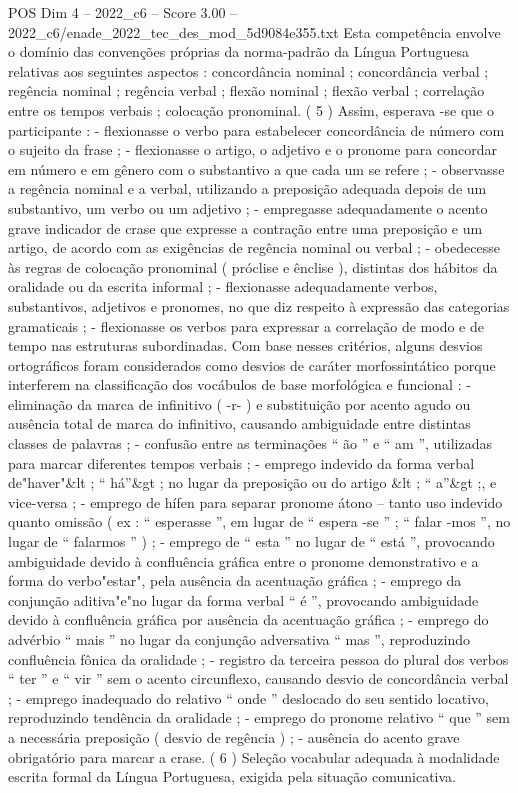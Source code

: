 \begin{textsample}{POS Dim 4 – 2022\_c6 – Score 3.00 – 2022\_c6/enade\_2022\_tec\_des\_mod\_5d9084e355.txt}
Esta competência envolve o domínio das convenções próprias da norma-padrão da Língua Portuguesa relativas aos seguintes aspectos : concordância nominal ; concordância verbal ; regência nominal ; regência verbal ; flexão nominal ; flexão verbal ; correlação entre os tempos verbais ; colocação pronominal. ( 5 ) Assim, esperava -se que o participante : - flexionasse o verbo para estabelecer concordância de número com o sujeito da frase ; - flexionasse o artigo, o adjetivo e o pronome para concordar em número e em gênero com o substantivo a que cada um se refere ; - observasse a regência nominal e a verbal, utilizando a preposição adequada depois de um substantivo, um verbo ou um adjetivo ; - empregasse adequadamente o acento grave indicador de crase que expresse a contração entre uma preposição e um artigo, de acordo com as exigências de regência nominal ou verbal ; - obedecesse às regras de colocação pronominal ( próclise e ênclise ), distintas dos hábitos da oralidade ou da escrita informal ; - flexionasse adequadamente verbos, substantivos, adjetivos e pronomes, no que diz respeito à expressão das categorias gramaticais ; - flexionasse os verbos para expressar a correlação de modo e de tempo nas estruturas subordinadas.
Com base nesses critérios, alguns desvios ortográficos foram considerados como desvios de caráter morfossintático porque interferem na classificação dos vocábulos de base morfológica e funcional : - eliminação da marca de infinitivo ( -r- ) e substituição por acento agudo ou ausência total de marca do infinitivo, causando ambiguidade entre distintas classes de palavras ; - confusão entre as terminações “ ão ” e “ am ”, utilizadas para marcar diferentes tempos verbais ; - emprego indevido da forma verbal de"haver"\&lt ; “ há”\&gt ; no lugar da preposição ou do artigo \&lt ; “ a”\&gt ;, e vice-versa ; - emprego de hífen para separar pronome átono – tanto uso indevido quanto omissão ( ex : “ esperasse ”, em lugar de “ espera -se ” ; “ falar -mos ”, no lugar de “ falarmos ” ) ; - emprego de “ esta ” no lugar de “ está ”, provocando ambiguidade devido à confluência gráfica entre o pronome demonstrativo e a forma do verbo"estar", pela ausência da acentuação gráfica ; - emprego da conjunção aditiva"e"no lugar da forma verbal “ é ”, provocando ambiguidade devido à confluência gráfica por ausência da acentuação gráfica ; - emprego do advérbio “ mais ” no lugar da conjunção adversativa “ mas ”, reproduzindo confluência fônica da oralidade ; - registro da terceira pessoa do plural dos verbos “ ter ” e “ vir ” sem o acento circunflexo, causando desvio de concordância verbal ; - emprego inadequado do relativo “ onde ” deslocado do seu sentido locativo, reproduzindo tendência da oralidade ; - emprego do pronome relativo “ que ” sem a necessária preposição ( desvio de regência ) ; - ausência do acento grave obrigatório para marcar a crase. ( 6 ) Seleção vocabular adequada à modalidade escrita formal da Língua Portuguesa, exigida pela situação comunicativa.

\end{textsample}
